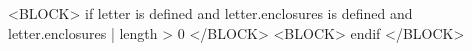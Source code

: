 
<BLOCK> if letter is defined and letter.enclosures is defined and letter.enclosures | length > 0 </BLOCK>
<BLOCK> endif </BLOCK>
